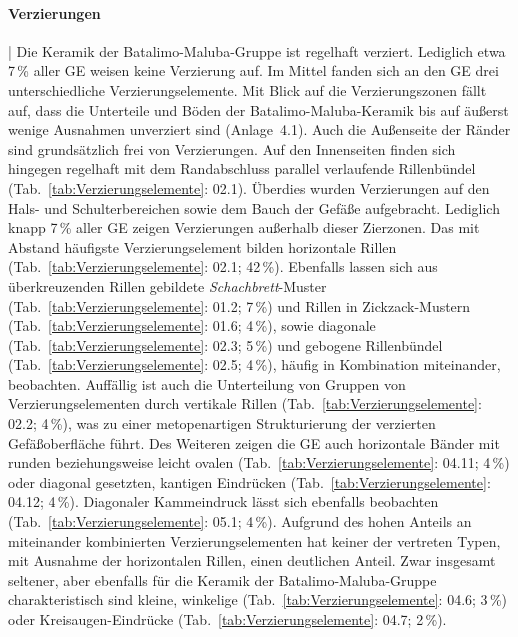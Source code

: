 \paragraph{Verzierungen}\hspace{-.5em}|\hspace{.5em}%
Die Keramik der Batalimo-Maluba-Gruppe ist regelhaft verziert. Lediglich etwa 7\,\% aller GE weisen keine Verzierung auf. Im Mittel fanden sich an den GE drei unterschiedliche Verzierungselemente. Mit Blick auf die Verzierungszonen fällt auf, dass die Unterteile und Böden der Batalimo-Maluba-Keramik bis auf äußerst wenige Ausnahmen unverziert sind (Anlage~4.1). Auch die Außenseite der Ränder sind grundsätzlich frei von Verzierungen. Auf den Innenseiten finden sich hingegen regelhaft mit dem Randabschluss parallel verlaufende Rillenbündel (Tab.~\ref{tab:Verzierungselemente}: 02.1). Überdies wurden Verzierungen auf den Hals- und Schulterbereichen sowie dem Bauch der Gefäße aufgebracht. Lediglich knapp 7\,\% aller GE zeigen Verzierungen außerhalb dieser Zierzonen. Das mit Abstand häufigste Verzierungselement bilden horizontale Rillen (Tab.~\ref{tab:Verzierungselemente}: 02.1; 42\,\%). Ebenfalls lassen sich aus überkreuzenden Rillen gebildete \textit{Schachbrett}-Muster (Tab.~\ref{tab:Verzierungselemente}: 01.2; 7\,\%) und Rillen in Zickzack-Mustern (Tab.~\ref{tab:Verzierungselemente}: 01.6; 4\,\%), sowie diagonale (Tab.~\ref{tab:Verzierungselemente}: 02.3; 5\,\%) und gebogene Rillenbündel (Tab.~\ref{tab:Verzierungselemente}: 02.5; 4\,\%), häufig in Kombination miteinander, beobachten. Auffällig ist auch die Unterteilung von Gruppen von Verzierungselementen durch vertikale Rillen (Tab.~\ref{tab:Verzierungselemente}: 02.2; 4\,\%), was zu einer metopenartigen Strukturierung der verzierten Gefäßoberfläche führt. Des Weiteren zeigen die GE auch horizontale Bänder mit runden beziehungsweise leicht ovalen (Tab.~\ref{tab:Verzierungselemente}: 04.11; 4\,\%) oder diagonal gesetzten, kantigen Eindrücken (Tab.~\ref{tab:Verzierungselemente}: 04.12; 4\,\%). Diagonaler Kammeindruck lässt sich ebenfalls beobachten (Tab.~\ref{tab:Verzierungselemente}: 05.1; 4\,\%). Aufgrund des hohen Anteils an miteinander kombinierten Verzierungselementen hat keiner der vertreten Typen, mit Ausnahme der horizontalen Rillen, einen deutlichen Anteil. Zwar insgesamt seltener, aber ebenfalls für die Keramik der Batalimo-Maluba-Gruppe charakteristisch sind kleine, winkelige (Tab.~\ref{tab:Verzierungselemente}: 04.6; 3\,\%) oder Kreisaugen-Eindrücke (Tab.~\ref{tab:Verzierungselemente}: 04.7; 2\,\%). 

